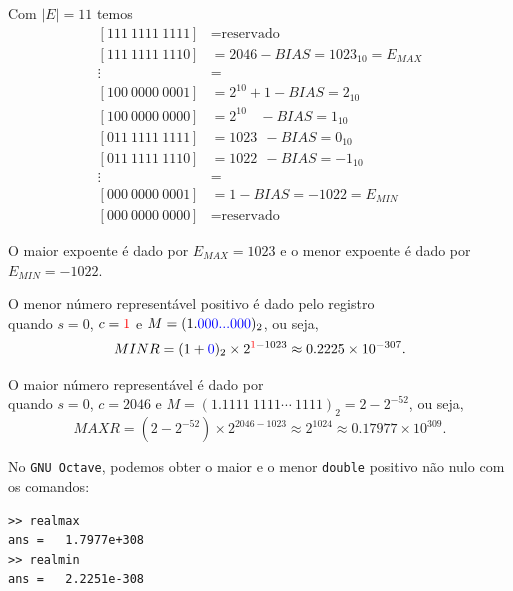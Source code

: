Com $|E| = 11$ temos
\begin{equation}
  \begin{split}
 [111~1111~1111] &= \text{reservado}\\
 [111~1111~1110] &= 2046-BIAS      = 1023_{10}= E_{MAX}\\
     \vdots      &=  \\
 [100~0000~0001] &= 2^{10}+1  -BIAS =  2_{10} \\
 [100~0000~0000] &= 2^{10}~~~~-BIAS =  1_{10} \\
 [011~1111~1111] &= 1023   ~~ -BIAS =  0_{10} \\
 [011~1111~1110] &= 1022   ~~ -BIAS = -1_{10} \\
     \vdots      &=  \\
 [000~0000~0001] &= 1-BIAS = -1022 = E_{MIN}\\
 [000~0000~0000] &= \text{reservado}
  \end{split}
\end{equation}

O maior expoente é dado por $E_{MAX}=1023$ e o menor expoente é dado por $E_{MIN}=-1022$.

O menor número representável positivo é dado pelo registro
\begin{equation}
[0|000~0000~000\RED{1} |\BLU{0000~0000~0000\ldots 0000~0000}]
\end{equation}
quando $s=0$, $c={\color{red}{1}}$ e $M=(1.{\color{blue}{000...000}})_2$, ou seja,
\begin{equation}
MINR=(1+{\color{blue}{0}})_2\times 2^{{\color{red}{1}}-1023} \approx 0.2225\times 10^{-307}.
\end{equation}

O maior número representável é dado por
\begin{equation}
[0|\RED{111~1111~1110} |\BLU{1111~1111~\cdots~1111~1111}]
\end{equation}
quando $s=0$, $c=2046$ e $M=(1.1111~1111\cdots~1111)_2=2-2^{-52}$, ou seja,
\begin{equation}
MAXR=(2-2^{-52})\times 2^{2046-1023} \approx 2^{1024}\approx0.17977\times 10^{309}.
\end{equation}

\begin{obs}
  No \verb+GNU Octave+, podemos obter o maior e o menor \verb+double+ positivo não nulo com os comandos:
\begin{verbatim}
>> realmax
ans =   1.7977e+308
>> realmin
ans =   2.2251e-308
\end{verbatim}
\end{obs}


